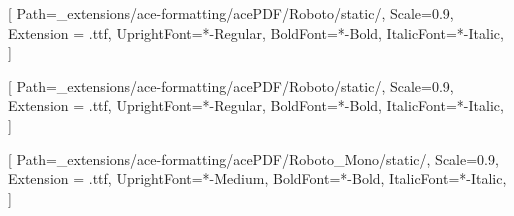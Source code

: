 \setmainfont{Roboto}[
    Path=_extensions/ace-formatting/acePDF/Roboto/static/,
    Scale=0.9,
    Extension = .ttf,
    UprightFont=*-Regular,
    BoldFont=*-Bold,
    ItalicFont=*-Italic,
    ]
    
\setsansfont{Roboto}[
    Path=_extensions/ace-formatting/acePDF/Roboto/static/,
    Scale=0.9,
    Extension = .ttf,
    UprightFont=*-Regular,
    BoldFont=*-Bold,
    ItalicFont=*-Italic,
    ]

\setmonofont{RobotoMono}[
    Path=_extensions/ace-formatting/acePDF/Roboto_Mono/static/,
    Scale=0.9,
    Extension = .ttf,
    UprightFont=*-Medium,
    BoldFont=*-Bold,
    ItalicFont=*-Italic,
    ]